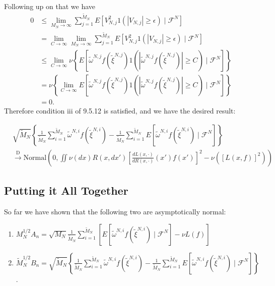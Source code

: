 \documentclass{article}
\begin{document}
Following up on that we have 
\begin{align*}
0 &\le \lim_{M_N \to \infty} \sum_{j=1}^{\tilde{M}_N} E[V_{N,j}^2 1\left( |V_{N,j}| \ge \epsilon \right) \mid \mathcal{F}^N] \\
&= \lim_{C \to \infty} \lim_{M_N \to \infty} \sum_{j=1}^{\tilde{M}_N} E[V_{N,j}^2 1\left( |V_{N,j}| \ge \epsilon \right) \mid \mathcal{F}^N] \tag{no $C$ so limit doesn't matter}\\
&\le \lim_{C \to \infty} \nu\left\{ E[ \tilde{\omega}^{N,j} f(\tilde{\xi}^{N,j}) 1\left( |\tilde{\omega}^{N,j} f(\tilde{\xi}^{N,j})| \ge C \right) \mid \mathcal{F}^N] \right\} \tag{above work} \\
&= \nu\left\{ \lim_{C \to \infty} E[ \tilde{\omega}^{N,j} f(\tilde{\xi}^{N,j}) 1\left( |\tilde{\omega}^{N,j} f(\tilde{\xi}^{N,j})| \ge C \right) \mid \mathcal{F}^N] \right\} \tag{DCT} \\
&= 0.
\end{align*}
Therefore condition iii of 9.5.12 is satisfied, and we have the desired result:


\begin{align*}
& \sqrt{\tilde{M}_N}\left\{  \frac{1}{\tilde{M}_N} \sum_{i=1}^{\tilde{M}_N} \tilde{\omega}^{N,i} f(\tilde{\xi}^{N,i}) -  \frac{1}{\tilde{M}_N} \sum_{i=1}^{\tilde{M}_N} E[ \tilde{\omega}^{N,i} f(\tilde{\xi}^{N,i}) \mid \mathcal{F}^N] \right\} \\
& \overset{\text{D}}{\to}
\text{Normal}\left( 0, 
\iint \nu(dx) R(x,dx')\left[ \frac{dL(x,\cdot)}{dR(x,\cdot)}(x') f(x') \right]^2
-\nu\left(\left[L(x,f) \right]^2\right)\right)
\end{align*}



\subsection{Putting it All Together}


So far we have shown that the following two are asymptotically normal:
\begin{enumerate}
\item $M_N^{1/2}A_n = \sqrt{M_N} \frac{1}{\tilde{M}_N} \sum_{i=1}^{\tilde{M}_N} \left[ E[ \tilde{\omega}^{N,i} f(\tilde{\xi}^{N,i}) \mid \mathcal{F}^N] - \nu L(f) \right]$
\item $\tilde{M}_N^{1/2} B_n = \sqrt{\tilde{M}_N}\left\{  \frac{1}{\tilde{M}_N} \sum_{i=1}^{\tilde{M}_N} \tilde{\omega}^{N,i} f(\tilde{\xi}^{N,i}) -  \frac{1}{\tilde{M}_N} \sum_{i=1}^{\tilde{M}_N} E[ \tilde{\omega}^{N,i} f(\tilde{\xi}^{N,i}) \mid \mathcal{F}^N] \right\} $.
\end{enumerate}
\end{document}
